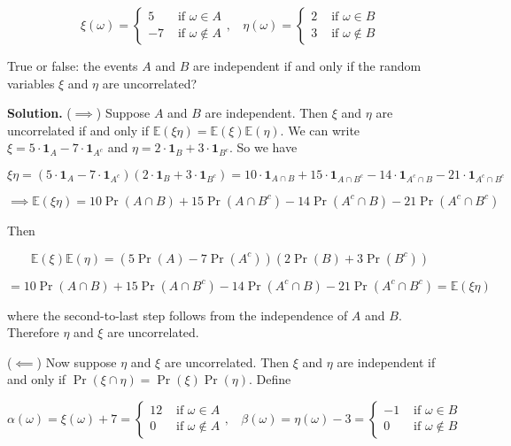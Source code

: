 \documentclass{article}
\newcommand{\E}{\mathbb{E}}
\begin{document}
\[
\xi(\omega) = \begin{cases} 
      5 & \text{ if } \omega \in A \\
      -7 &  \text{ if } \omega \notin A 
   \end{cases}, \ \ \ \ \eta(\omega) = \begin{cases} 
      2 & \text{ if } \omega \in B \\
      3 &  \text{ if } \omega \notin B 
   \end{cases}
\]

True or false: the events \(A\) and \(B\) are independent if and only if the random variables \(\xi\) and \(\eta\) are uncorrelated?

\textbf{Solution.} (\(\implies\)) Suppose \(A\) and \(B\) are independent. Then \(\xi\) and \(\eta\) are uncorrelated if and only if \(\E(\xi \eta ) = \E(\xi) \E(\eta)\). We can write \(\xi = 5 \cdot \boldsymbol{1}_A - 7 \cdot \boldsymbol{1}_{A^c}\) and \(\eta = 2 \cdot \boldsymbol{1}_B + 3 \cdot \boldsymbol{1}_{B^c}\). So we have

\[
\xi \eta = (5 \cdot \boldsymbol{1}_A - 7 \cdot \boldsymbol{1}_{A^c})(2 \cdot \boldsymbol{1}_B + 3 \cdot \boldsymbol{1}_{B^c}) = 10 \cdot \boldsymbol{1}_{A \cap B} +15 \cdot \boldsymbol{1}_{A \cap B^c} - 14 \cdot \boldsymbol{1}_{A^c \cap B} - 21 \cdot \boldsymbol{1}_{A^c \cap B^c}
\]

\[
\implies \E(\xi \eta ) = 10 \Pr(A \cap B) +15\Pr(A \cap B^c) - 14 \Pr(A^c \cap B) - 21\Pr(A^c \cap B^c)
\]

Then

\[
\E(\xi) \E(\eta) = (5 \Pr(A) - 7 \Pr(A^c))(2 \Pr(B) + 3 \Pr(B^c)) 
\]

\[
= 10\Pr(A \cap B) + 15 \Pr(A \cap B^c) - 14 \Pr(A^c \cap B) - 21 \Pr(A^c \cap B^c) = \E(\xi \eta )
\]

where the second-to-last step follows from the independence of \(A\) and \(B\). Therefore \(\eta\) and \(\xi\) are uncorrelated.

(\(\impliedby\)) Now suppose \(\eta\) and \(\xi\) are uncorrelated. Then \(\xi\) and \(\eta\) are independent if and only if \(\Pr(\xi \cap \eta) = \Pr(\xi) \Pr(\eta)\). Define

\[
\alpha(\omega) =  \xi(\omega) + 7 = \begin{cases} 
      12 & \text{ if } \omega \in A \\
      0 &  \text{ if } \omega \notin A 
   \end{cases}, \ \ \ \ \beta(\omega) =  \eta(\omega) - 3 = \begin{cases} 
      -1 & \text{ if } \omega \in B \\
      0 &  \text{ if } \omega \notin B 
   \end{cases}
\]
\end{document}

